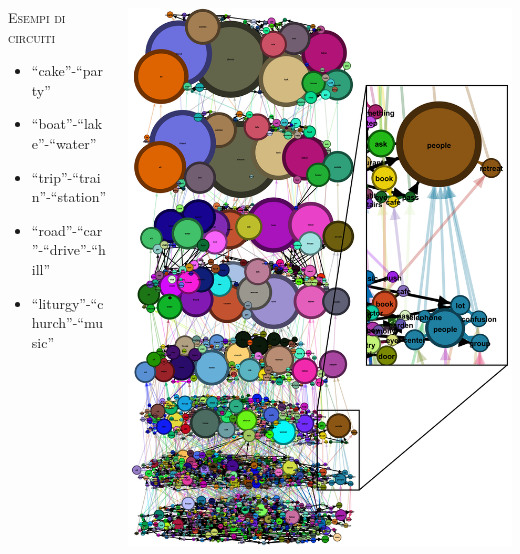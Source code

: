 \begin{minipage}[t]{\textwidth}
    \vspace{-0.4cm}
    \begin{columns}
    \begin{column}{0.33\textwidth}
        {\color{orangeUnicam} \scshape \small Esempi di circuiti}
        {\tiny
        \begin{itemize}
            \item “cake”-“party”
            \item “boat”-“lake”-“water”
            \item “trip”-“train”-“station”
            \item “road”-“car”-“drive”-“hill”
            \item “liturgy”-“church”-“music”
        \end{itemize}}
        \vspace{1.74cm}
    \end{column}
    \hfill
    \begin{column}{0.66\textwidth}
        \includegraphics[height=0.85\textheight]{immagini/grafo_ml_focus}
    \end{column}
    \end{columns}
\end{minipage}